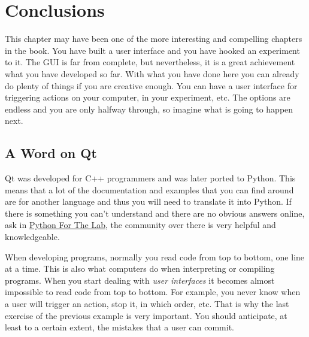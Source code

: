 

\section{Conclusions}\label{conclusions}
This chapter may have been one of the more interesting and compelling
chapters in the book. You have built a user interface and you have
hooked an experiment to it. The {GUI} is far from complete, but
nevertheless, it is a great achievement what you have developed so far.
With what you have done here you can already do plenty of things if you
are creative enough. You can have a user interface for triggering
actions on your computer, in your experiment, etc. The options are
endless and you are only halfway through, so imagine what is going to
happen next.

\subsection{A Word on Qt}\label{a-word-onqt}
Qt was developed for C++ programmers and was later ported to Python.
This means that a lot of the documentation and examples that you can
find around are for another language and thus you will need to translate
it into Python. If there is something you can't understand and there are
no obvious answers online, ask in
\href{https://forum.pythonforthelab.com}{Python For The Lab}, the community over there is very helpful and knowledgeable.

When developing programs, normally you read code from top to bottom, one
line at a time. This is also what computers do when interpreting or
compiling programs. When you start dealing with \emph{user interfaces}
it becomes almost impossible to read code from top to bottom. For
example, you never know when a user will trigger an action, stop it, in
which order, etc. That is why the last exercise of the previous example
is very important. You should anticipate, at least to a certain extent,
the mistakes that a user can commit.

